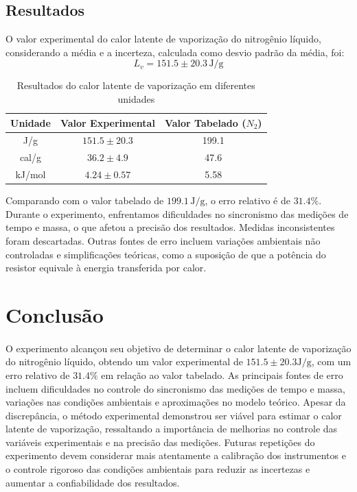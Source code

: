 \documentclass[brazilian,12pt,a4paper,final]{article}
\begin{document}
\subsection*{Resultados}
O valor experimental do calor latente de vaporização do nitrogênio líquido, considerando a média e a incerteza, calculada como desvio padrão da média, foi:
$$
    L_v = 151.5 \pm 20.3 \, \text{J/g}
$$
\begin{table}[!htb]
    \centering
    \caption{Resultados do calor latente de vaporização em diferentes unidades}
    \label{tab:conversao}
    \begin{tabular}{ |c|c|c| }
        \hline
        \textbf{Unidade} & \textbf{Valor Experimental} & \textbf{Valor Tabelado ($N_2$)} \\ \hline
        J/g & $151.5 \pm 20.3$ & 199.1 \\ \hline
        cal/g & $36.2 \pm 4.9$ & 47.6 \\ \hline
        kJ/mol & $4.24 \pm 0.57$ & 5.58 \\ \hline
    \end{tabular}
\end{table}

Comparando com o valor tabelado de $199.1 \, \text{J/g}$, o erro relativo é de $31.4\%$. Durante o experimento, enfrentamos dificuldades no sincronismo das medições de tempo e massa, o que afetou a precisão dos resultados. Medidas inconsistentes foram descartadas. Outras fontes de erro incluem variações ambientais não controladas e simplificações teóricas, como a suposição de que a potência do resistor equivale à energia transferida por calor.
\section{Conclusão}
\paragraph{}
O experimento alcançou seu objetivo de determinar o calor latente de vaporização do nitrogênio líquido, obtendo um valor experimental de $151.5\pm20.3\text{J/g}$, com um erro relativo de $31.4\%$ em relação ao valor tabelado. As principais fontes de erro incluem dificuldades no controle do sincronismo das medições de tempo e massa, variações nas condições ambientais e aproximações no modelo teórico. Apesar da discrepância, o método experimental demonstrou ser viável para estimar o calor latente de vaporização, ressaltando a importância de melhorias no controle das variáveis experimentais e na precisão das medições. Futuras repetições do experimento devem considerar mais atentamente a calibração dos instrumentos e o controle rigoroso das condições ambientais para reduzir as incertezas e aumentar a confiabilidade dos resultados.
\end{document}

